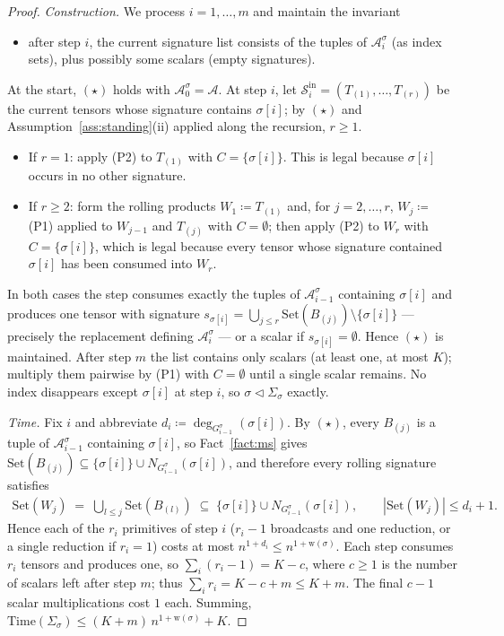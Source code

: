 \documentclass[11pt]{article}
\newcommand{\calA}{\mathcal{A}}
\newcommand{\calS}{\mathcal{S}}
\newcommand{\takesetp}[1]{\mathrm{Set}(#1)}
\newcommand{\degp}[2]{\deg_{#2}(#1)}
\newcommand{\wid}{\mathrm{w}}
\newcommand{\Time}{\mathrm{Time}}
\theoremstyle{plain}
\theoremstyle{definition}
\theoremstyle{remark}
\begin{document}
\begin{proof}
\emph{Construction.}  We process $i = 1,\dots,m$ and maintain the
invariant
\begin{itemize}
\item[$(\star)$] after step $i$, the current signature list consists of
the tuples of $\calA^\sigma_i$ (as index sets), plus possibly some
scalars (empty signatures).
\end{itemize}
At the start, $(\star)$ holds with $\calA^\sigma_0 = \calA$.  At step
$i$, let $\calS_i^{\mathrm{in}} = (T_{(1)},\dots,T_{(r)})$ be the current
tensors whose signature contains $\sigma[i]$; by $(\star)$ and
Assumption~\ref{ass:standing}(ii) applied along the recursion,
$r \ge 1$.
\begin{itemize}
\item If $r=1$: apply (P2) to $T_{(1)}$ with $C=\{\sigma[i]\}$.  This is
legal because $\sigma[i]$ occurs in no other signature.
\item If $r\ge 2$: form the rolling products
$W_1 \coloneqq T_{(1)}$ and, for $j = 2,\dots,r$,
$W_j \coloneqq$ (P1) applied to $W_{j-1}$ and $T_{(j)}$ with
$C=\emptyset$; then apply (P2) to $W_r$ with $C=\{\sigma[i]\}$, which is
legal because every tensor whose signature contained $\sigma[i]$ has been
consumed into $W_r$.
\end{itemize}
In both cases the step consumes exactly the tuples of
$\calA^\sigma_{i-1}$ containing $\sigma[i]$ and produces one tensor with
signature $s_{\sigma[i]} = \bigcup_{j\le r}\takesetp{B_{(j)}} \setminus
\{\sigma[i]\}$ --- precisely the replacement defining
$\calA^\sigma_{i}$ --- or a scalar if $s_{\sigma[i]} = \emptyset$.  Hence
$(\star)$ is maintained.  After step $m$ the list contains only scalars
(at least one, at most $K$); multiply them pairwise by (P1) with
$C=\emptyset$ until a single scalar remains.  No index disappears except
$\sigma[i]$ at step $i$, so $\sigma \vartriangleleft \Sigma_\sigma$
exactly.

\emph{Time.}  Fix $i$ and abbreviate
$d_i \coloneqq \degp{\sigma[i]}{G^\sigma_{i-1}}$.  By $(\star)$, every
$B_{(j)}$ is a tuple of $\calA^\sigma_{i-1}$ containing $\sigma[i]$, so
Fact~\ref{fact:ms} gives $\takesetp{B_{(j)}} \subseteq \{\sigma[i]\}\cup
N_{G^\sigma_{i-1}}(\sigma[i])$, and therefore every rolling signature
satisfies
\begin{align*}
   \takesetp{W_j} \;=\; \bigcup_{l\le j} \takesetp{B_{(l)}}
   \;\subseteq\; \{\sigma[i]\}\cup N_{G^\sigma_{i-1}}(\sigma[i]),
   \qquad |\takesetp{W_j}| \le d_i + 1 .
\end{align*}
Hence each of the $r_i$ primitives of step $i$ ($r_i-1$ broadcasts and
one reduction, or a single reduction if $r_i=1$) costs at most
$n^{1+d_i} \le n^{1+\wid(\sigma)}$.  Each step consumes $r_i$ tensors and
produces one, so $\sum_i (r_i - 1) = K - c$, where $c\ge1$ is the number
of scalars left after step $m$; thus $\sum_i r_i = K - c + m \le K + m$.
The final $c-1$ scalar multiplications cost $1$ each.  Summing,
$\Time(\Sigma_\sigma) \le (K+m)\,n^{1+\wid(\sigma)} + K$.


\end{proof}
\end{document}

